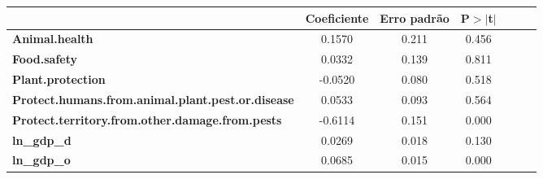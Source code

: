 \begin{center}
\begin{tabular}{lcccccc}
                                                          & \textbf{Coeficiente} & \textbf{Erro padrão} &\textbf{P$> |$t$|$}\\
\midrule
\textbf{Animal.health}                                    &       0.1570  &        0.211     &        0.456\\
\textbf{Food.safety}                                      &       0.0332  &        0.139     &        0.811\\
\textbf{Plant.protection}                                 &      -0.0520  &        0.080     &        0.518\\
\textbf{Protect.humans.from.animal.plant.pest.or.disease} &       0.0533  &        0.093     &        0.564\\
\textbf{Protect.territory.from.other.damage.from.pests}   &      -0.6114  &        0.151     &        0.000\\
\textbf{ln\_gdp\_d}                                       &       0.0269  &        0.018     &        0.130\\
\textbf{ln\_gdp\_o}                                       &       0.0685  &        0.015     &        0.000\\
\bottomrule
\end{tabular}
\end{center}